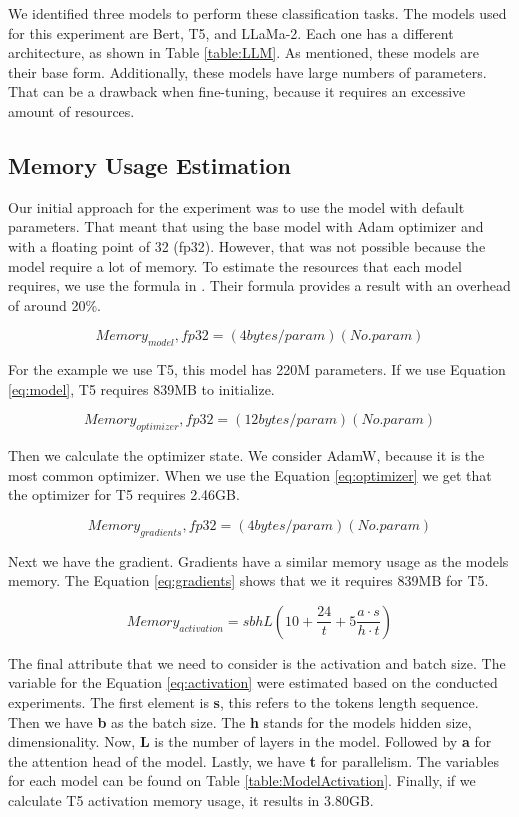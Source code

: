 We identified three models to perform these classification tasks. The models used for this experiment are Bert, T5, and LLaMa-2. Each one has a different architecture, as shown in Table \ref{table:LLM}. As mentioned, these models are their base form. Additionally, these models have large numbers of parameters. That can be a drawback when fine-tuning, because it requires an excessive amount of resources. 


\subsection{Memory Usage Estimation}
Our initial approach for the experiment was to use the model with default parameters. That meant that using the base model with Adam optimizer and with a floating point of 32 (fp32). However, that was not possible because the model require a lot of memory. To estimate the resources that each model requires, we use the formula in \cite{transformer-math-eleutherai}. Their formula provides a result with an overhead of around 20\%.


\[ Memory_{model}, fp32 = (4 bytes/param) (No. param) \label{eq:model} \tag{1} \] 

For the example we use T5, this model has 220M parameters. If we use Equation \ref{eq:model}, T5 requires 839MB to initialize. 


\[ Memory_{optimizer}, fp32 = (12 bytes/param) (No. param) \label{eq:optimizer} \tag{2} \] 

Then we calculate the optimizer state. We consider AdamW, because it is the most common optimizer. When we use the Equation \ref{eq:optimizer} we get that the optimizer for T5 requires 2.46GB. 


\[ Memory_{gradients}, fp32 = (4 bytes/param) (No. param) \label{eq:gradients} \tag{3} \] 

Next we have the gradient. Gradients have a similar memory usage as the models memory. The Equation \ref{eq:gradients} shows that we it requires 839MB for T5.


\[ Memory_{activation} = sbhL(10 + \frac{24}{t} + 5 \frac{a \cdot s}{h \cdot t} ) \label{eq:activation} \tag{4} \] 

The final attribute that we need to consider is the activation and batch size. The variable for the Equation \ref{eq:activation} were estimated based on the conducted experiments. The first element is \textbf{s}, this refers to the tokens length sequence. Then we have \textbf{b} as the batch size. The \textbf{h} stands for the models hidden size, dimensionality. Now, \textbf{L} is the number of layers in the model. Followed by \textbf{a} for the attention head of the model. Lastly, we have \textbf{t} for parallelism. The variables for each model can be found on Table \ref{table:ModelActivation}. Finally, if we calculate T5 activation memory usage, it results in 3.80GB.

